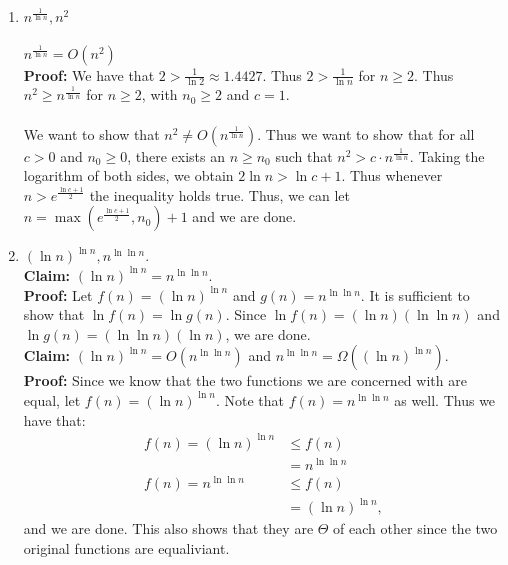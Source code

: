 \documentclass{article}
\begin{document}
\begin{enumerate}
	\item $\displaystyle n^{\frac{1}{\ln n}}, n^2$ \\ \\
				$\displaystyle n^{\frac{1}{\ln n}} = O(n^2)$ \\
				{\bf Proof:}
					We have that $2 > \frac{1}{\ln{2}} \approx 1.4427$. Thus $2 > \frac{1}{\ln n}$ for $n \geq 2$. Thus $n^2 \geq n^{\frac{1}{\ln n}}$ for 
					$n \geq 2$, with $n_0 \geq 2$ and $c = 1$. \\ \\
				We want to show that $n^2 \neq O(n^{\frac{1}{\ln n}})$. Thus we want to show that for all $c > 0$ and $n_0 \geq 0$, there exists an $n \geq n_0$ 
				such that $n^2 > c \cdot n^{\frac{1}{\ln n}}$. Taking the logarithm of both sides, we obtain $2\ln n > \ln c + 1$. Thus whenever 
				$n > e^{\frac{\ln c + 1}{2}}$ the inequality holds true. Thus, we can let $n = \max(e^{\frac{\ln c + 1}{2}}, n_0) + 1$ and we are done.
					
	\pagebreak
					
	\item $\displaystyle (\ln n)^{\ln n}, n^{\ln \ln n}$. \\
	
				{\bf Claim:} $\displaystyle (\ln n)^{\ln n} = n^{\ln \ln n}$. \\
				{\bf Proof:} Let $\displaystyle f(n) = (\ln n)^{\ln n}$ and $\displaystyle g(n) = n^{\ln \ln n}$. It is sufficient to show that 
				$\ln f(n) = \ln g(n)$. Since $\ln f(n) = (\ln n)(\ln \ln n)$ and $\ln g(n) = (\ln \ln n)(\ln n)$, we are done. \\
				
				{\bf Claim:} $\displaystyle (\ln n)^{\ln n} = O(n^{\ln \ln n})$ and $\displaystyle n^{\ln \ln n} = \Omega((\ln n)^{\ln n})$. \\
				{\bf Proof:} Since we know that the two functions we are concerned with are equal, let $\displaystyle f(n) = (\ln n)^{\ln n}$. Note that 
				$\displaystyle f(n) = n^{\ln \ln n}$ as well. Thus we have that:
					\begin{align*}
						f(n) = (\ln n)^{\ln n} & \leq f(n) \\
																	 & = n^{\ln \ln n} \\
						f(n) = n^{\ln \ln n} & \leq f(n) \\
																 & = (\ln n)^{\ln n},
					\end{align*}
				and we are done. This also shows that they are $\Theta$ of each other since the two original functions are equaliviant.
	

\end{enumerate}
\end{document}
